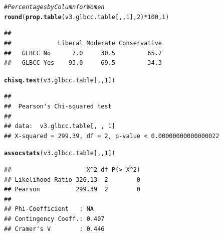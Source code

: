 \documentclass[11pt,openany]{book}\usepackage[]{graphicx}\usepackage[]{color}
\makeatletter
\newcommand{\hlnum}[1]{\textcolor[rgb]{0.686,0.059,0.569}{#1}}%
\newcommand{\hlcom}[1]{\textcolor[rgb]{0.678,0.584,0.686}{\textit{#1}}}%
\newcommand{\hlopt}[1]{\textcolor[rgb]{0,0,0}{#1}}%
\newcommand{\hlstd}[1]{\textcolor[rgb]{0.345,0.345,0.345}{#1}}%
\newcommand{\hlkwd}[1]{\textcolor[rgb]{0.737,0.353,0.396}{\textbf{#1}}}%
\newenvironment{kframe}{%
 \def\at@end@of@kframe{}%
 \ifinner\ifhmode%
  \def\at@end@of@kframe{\end{minipage}}%
  \begin{minipage}{\columnwidth}%
 \fi\fi%
 \def\FrameCommand##1{\hskip\@totalleftmargin \hskip-\fboxsep
 \colorbox{shadecolor}{##1}\hskip-\fboxsep
     \hskip-\linewidth \hskip-\@totalleftmargin \hskip\columnwidth}%
 \MakeFramed {\advance\hsize-\width
   \@totalleftmargin\z@ \linewidth\hsize
   \@setminipage}}%
 {\par\unskip\endMakeFramed%
 \at@end@of@kframe}
\newenvironment{knitrout}{}{} %
\renewenvironment{knitrout}{\begin{singlespace}}{\end{singlespace}} %
\makeatother
\begin{document}
\begin{knitrout}
\color{fgcolor}\begin{kframe}
\begin{alltt}
\hlcom{# Percentages by Column for Women}
\hlkwd{round}\hlstd{(}\hlkwd{prop.table}\hlstd{(v3.glbcc.table[, ,} \hlnum{1}\hlstd{],} \hlnum{2}\hlstd{)} \hlopt{*} \hlnum{100}\hlstd{,} \hlnum{1}\hlstd{)}
\end{alltt}
\begin{verbatim}
##            
##             Liberal Moderate Conservative
##   GLBCC No      7.0     30.5         65.7
##   GLBCC Yes    93.0     69.5         34.3
\end{verbatim}
\begin{alltt}
\hlkwd{chisq.test}\hlstd{(v3.glbcc.table[, ,} \hlnum{1}\hlstd{])}
\end{alltt}
\begin{verbatim}
## 
## 	Pearson's Chi-squared test
## 
## data:  v3.glbcc.table[, , 1]
## X-squared = 299.39, df = 2, p-value < 0.00000000000000022
\end{verbatim}
\begin{alltt}
\hlkwd{assocstats}\hlstd{(v3.glbcc.table[, ,} \hlnum{1}\hlstd{])}
\end{alltt}
\begin{verbatim}
##                     X^2 df P(> X^2)
## Likelihood Ratio 326.13  2        0
## Pearson          299.39  2        0
## 
## Phi-Coefficient   : NA 
## Contingency Coeff.: 0.407 
## Cramer's V        : 0.446
\end{verbatim}
\end{kframe}
\end{knitrout}
\end{document}
